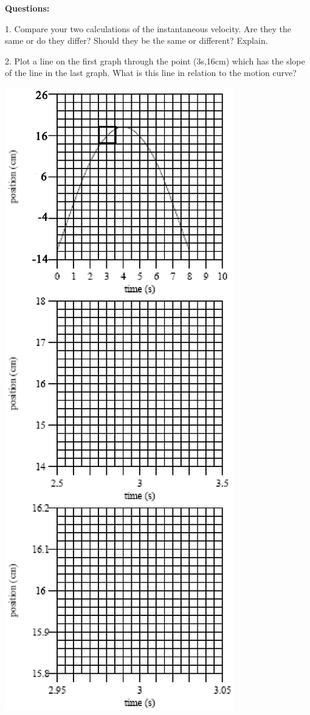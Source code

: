 \medskip

{\noindent \bf Questions:}

1. Compare your two calculations of the instantaneous velocity. Are they the
same or do they differ? Should they be the same or different? Explain. 
\answerspace{20mm}

2. Plot a line on the first graph through the point (3s,16cm) which has the
slope of the line in the last graph. What is this line in relation to the motion
curve?
\answerspace{20mm}

\pagebreak[2]
\vspace{0.3cm}
{\par\centering \includegraphics{instantaneous_velocity/instantaneous_velocity_fig1.eps} \par}
\vspace{0.3cm}

